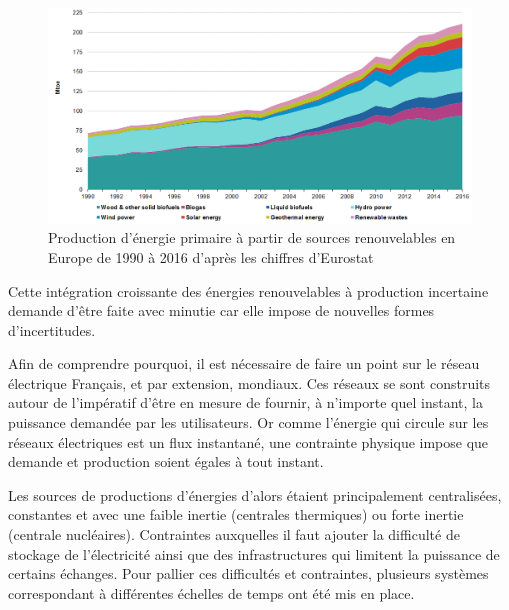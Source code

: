 \documentclass[12pt]{report}
\begin{document}
\begin{figure}[htbp]
	\begin{center}
		\includegraphics[width = \linewidth]{Images/Intro/Primary_production_of_energy_1990-2016.png}
		\caption{Production d'énergie primaire à partir de sources renouvelables en Europe de 1990 à 2016 d'après les chiffres d'Eurostat}
		\label{fig:Intro_EnergyProduction}
	\end{center}
\end{figure}

Cette intégration croissante des énergies renouvelables à production incertaine demande d'être faite avec minutie car elle impose de nouvelles formes d'incertitudes. %

Afin de comprendre pourquoi, il est nécessaire de faire un point sur le réseau électrique Français, et par extension, mondiaux. Ces réseaux se sont construits autour de l'impératif d'être en mesure de fournir, à n'importe quel instant, la puissance demandée par les utilisateurs. Or comme l'énergie qui circule sur les réseaux électriques est un flux instantané, une contrainte physique impose que demande et production soient égales à tout instant.

Les sources de productions d'énergies d'alors étaient principalement centralisées, constantes et avec une faible inertie (centrales thermiques) ou forte inertie (centrale nucléaires).  Contraintes auxquelles il faut ajouter la difficulté de stockage de l'électricité ainsi que des infrastructures qui limitent la puissance de certains échanges. Pour pallier ces difficultés et contraintes, plusieurs systèmes correspondant à différentes échelles de temps ont été mis en place.
\end{document}
